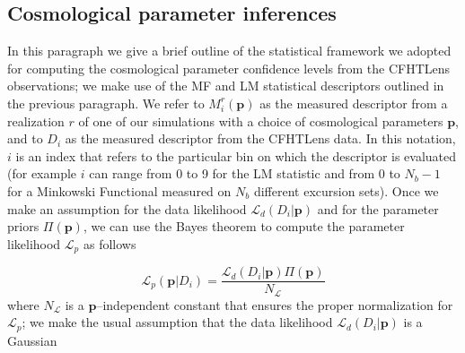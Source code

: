 \documentclass[reprint,aps,prd,superscriptaddress,showkeys]{revtex4-1}
\begin{document}
\subsection{Cosmological parameter inferences}
\label{cosmostats}
In this paragraph we give a brief outline of the statistical framework we adopted for computing the cosmological parameter confidence levels from the CFHTLens observations; we make use of the MF and LM statistical descriptors outlined in the previous paragraph. We refer to $M_i^r(\mathbf{p})$ as the measured descriptor from a realization $r$ of one of our simulations with a choice of cosmological parameters $\mathbf{p}$, and to $D_i$ as the measured descriptor from the CFHTLens data. In this notation, $i$ is an index that refers to the particular bin on which the descriptor is evaluated (for example $i$ can range from 0 to 9 for the LM statistic and from 0 to $N_b-1$ for a Minkowski Functional measured on $N_b$ different excursion sets). Once we make an assumption for the data likelihood $\mathcal{L}_d(D_i\vert \mathbf{p})$ and for the parameter priors $\Pi(\mathbf{p})$, we can use the Bayes theorem to compute the parameter likelihood $\mathcal{L}_p$ as follows

\begin{equation}
\label{parameterlikelihood}
\mathcal{L}_p(\mathbf{p}\vert D_i) = \frac{\mathcal{L}_d(D_i\vert \mathbf{p})\Pi(\mathbf{p})}{N_{\mathcal{L}}}
\end{equation}
%
where $N_{\mathcal{L}}$ is a $\mathbf{p}$--independent constant that ensures the proper normalization for $\mathcal{L}_p$; we make the usual assumption that the data likelihood $\mathcal{L}_d(D_i\vert \mathbf{p})$ is a Gaussian
\end{document}
